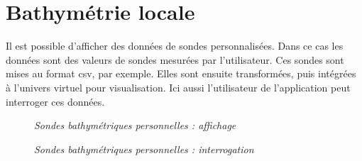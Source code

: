 \section{Bathymétrie locale}
Il est possible d'afficher des données de sondes personnalisées. Dans ce cas les données sont des valeurs de sondes mesurées par l'utilisateur. Ces sondes sont mises au format csv, par exemple. Elles sont ensuite transformées, puis intégrées à l'univers virtuel pour visualisation. Ici aussi l'utilisateur de l'application peut interroger ces données.
\begin{center}
\begin{figure}[ht]
\caption{\label{equiProj}\textit{Sondes bathymétriques personnelles : affichage}}
\end{figure}
\end{center}
\begin{center}
\begin{figure}[ht]
\caption{\label{equiProj}\textit{Sondes bathymétriques personnelles : interrogation}}
\end{figure}
\end{center}
